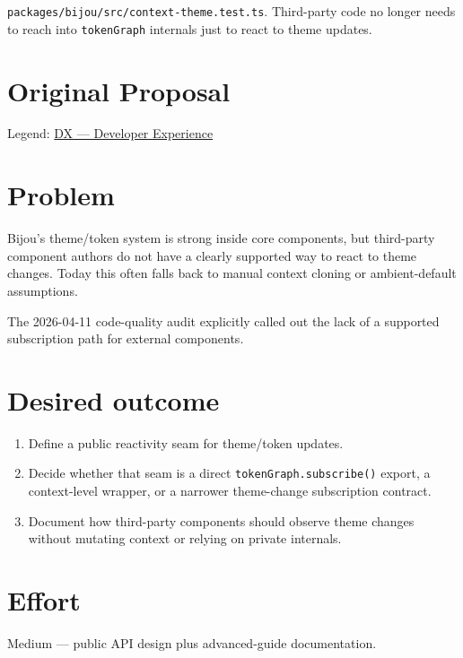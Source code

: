 \texttt{p\allowbreak{}a\allowbreak{}c\allowbreak{}k\allowbreak{}a\allowbreak{}g\allowbreak{}e\allowbreak{}s\allowbreak{}/\allowbreak{}b\allowbreak{}i\allowbreak{}j\allowbreak{}o\allowbreak{}u\allowbreak{}/\allowbreak{}s\allowbreak{}r\allowbreak{}c\allowbreak{}/\allowbreak{}c\allowbreak{}o\allowbreak{}n\allowbreak{}t\allowbreak{}e\allowbreak{}x\allowbreak{}t\allowbreak{}-\allowbreak{}t\allowbreak{}h\allowbreak{}e\allowbreak{}m\allowbreak{}e\allowbreak{}.\allowbreak{}t\allowbreak{}e\allowbreak{}s\allowbreak{}t\allowbreak{}.\allowbreak{}t\allowbreak{}s}. Third-party code no longer needs to reach into \texttt{t\allowbreak{}o\allowbreak{}k\allowbreak{}e\allowbreak{}n\allowbreak{}G\allowbreak{}r\allowbreak{}a\allowbreak{}p\allowbreak{}h} internals just to react to theme updates.

\section{Original Proposal}\label{record-330-original-proposal}

Legend: \href{https://github.com/flyingrobots/bijou/blob/1853ad902f6bf219326409e7f743a5a1d6517dbc/docs/method/legends/DX-developer-experience.md}{DX --- Developer Experience}

\section{Problem}\label{record-330-problem}

Bijou's theme/token system is strong inside core components, but third-party component authors do not have a clearly supported way to react to theme changes. Today this often falls back to manual context cloning or ambient-default assumptions.

The 2026-04-11 code-quality audit explicitly called out the lack of a supported subscription path for external components.

\section{Desired outcome}\label{record-330-desired-outcome}

\begin{enumerate}
\def\labelenumi{\arabic{enumi}.}
\tightlist
\item
  Define a public reactivity seam for theme/token updates.
\item
  Decide whether that seam is a direct \texttt{t\allowbreak{}o\allowbreak{}k\allowbreak{}e\allowbreak{}n\allowbreak{}G\allowbreak{}r\allowbreak{}a\allowbreak{}p\allowbreak{}h\allowbreak{}.\allowbreak{}s\allowbreak{}u\allowbreak{}b\allowbreak{}s\allowbreak{}c\allowbreak{}r\allowbreak{}i\allowbreak{}b\allowbreak{}e\allowbreak{}(\allowbreak{})} export, a context-level wrapper, or a narrower theme-change subscription contract.
\item
  Document how third-party components should observe theme changes without mutating context or relying on private internals.
\end{enumerate}

\section{Effort}\label{record-330-effort}

Medium --- public API design plus advanced-guide documentation.

